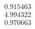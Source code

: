 \documentclass[preview]{standalone}
\begin{document}
\begin{align*}
0.915463 \\ 4.994322 \\ 0.970663
\end{align*}
\end{document}

